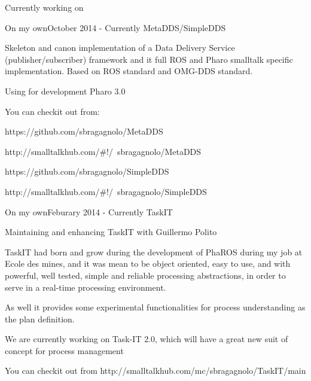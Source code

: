 \documentclass{resume} %
\begin{document}
\begin{rSection}{Currently working on}

\begin{rSubsection}{On my own}{October 2014 - Currently }{MetaDDS/SimpleDDS}
\item Skeleton and canon implementation of a Data Delivery Service (publisher/subscriber) framework and it full ROS and Pharo smalltalk specific implementation. Based on ROS standard and OMG-DDS standard.
\item Using for development Pharo 3.0
\item You can checkit out from: 
		\item https://github.com/sbragagnolo/MetaDDS
		\item http://smalltalkhub.com/\#!/~sbragagnolo/MetaDDS
		\item https://github.com/sbragagnolo/SimpleDDS
		\item http://smalltalkhub.com/\#!/~sbragagnolo/SimpleDDS
\end{rSubsection}

\begin{rSubsection}{On my own}{Feburary 2014 - Currently }{TaskIT}
\item Maintaining and enhancing TaskIT with Guillermo Polito
\item TaskIT had born and grow during the development of PhaROS during my job at Ecole des mines, and it was mean to be object oriented, easy to use, and with powerful, well tested, simple and reliable processing abstractions, in order to serve in a real-time processing environment. 
\item As well it provides some experimental functionalities for process understanding as the plan definition. 
\item We are currently working on Task-IT 2.0, which will have a great new suit of concept for process management
\item You can checkit out from http://smalltalkhub.com/mc/sbragagnolo/TaskIT/main
\end{rSubsection}

\end{rSection}
\end{document}
